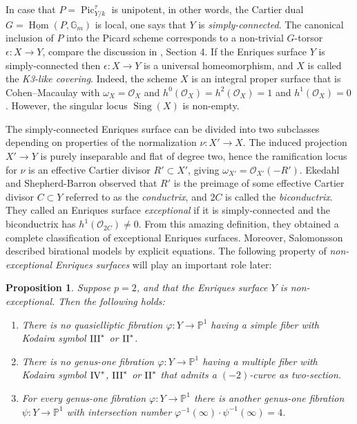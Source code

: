 \documentclass[oneside, 12pt]{amsart}
\newcommand\mylabel[1]{\label{#1}\marginpar{\vspace{-1ex}\medskip\medskip\footnotesize \tt #1}}
\renewcommand\mylabel[1]{\label{#1}}
\newtheorem{proposition}[theorem]{Proposition}
\theoremstyle{definition}
\theoremstyle{remark}
\newcommand{\PP}{\mathbb{P}}
\newcommand{\GG}{\mathbb{G}}
\newcommand{\II}{\text{\rm II}}
\newcommand{\III}{\text{\rm III}}
\newcommand{\IV}{\text{\rm IV}}
\renewcommand{\O}{\mathscr{O}}
\newcommand{\Pic}{\operatorname{Pic}}
\newcommand{\ra}{\rightarrow}
\newcommand{\Sing}{\operatorname{Sing}}
\newcommand{\uHom}{\underline{\operatorname{Hom}}}
\newcommand{\inv}{{-1}}
\begin{document}
In case that $P=\Pic^\tau_{Y/k}$ is unipotent, in other words, the Cartier dual $G=\uHom(P,\GG_m)$ is local,
one says that $Y$ is \emph{simply-connected}.
The canonical inclusion of $P$ into the Picard scheme corresponds to a non-trivial $G$-torsor $\epsilon:X\ra Y$,
compare the discussion in \cite{Schroeer 2021a}, Section 4.
If the Enriques surface $Y$ is simply-connected  then $\epsilon:X\ra Y$ is a universal homeomorphism, and  $X$ is called
the \emph{K3-like covering}. Indeed, the scheme $X$ is an integral proper surface that is Cohen--Macaulay 
with $\omega_X=\O_X$ and $h^0(\O_X)=h^2(\O_X)=1$ and $h^1(\O_X)=0$.
However, the singular locus $\Sing(X)$ is non-empty.

The simply-connected Enriques surface can be divided into two   subclasses depending on
properties of the normalization $\nu:X'\ra X$. The induced projection $X'\ra Y$ is purely inseparable and flat of degree two,
hence the ramification locus for $\nu$ is an effective Cartier divisor $R'\subset X'$, giving $\omega_{X'}=\O_{X'}(-R')$.
Ekedahl and Shepherd-Barron \cite{Ekedahl; Shepherd-Barron 2004} 
observed that $R'$ is the preimage of some effective Cartier divisor $C\subset Y$
referred to as the  \emph{conductrix}, and  $2C$ is called the \emph{biconductrix}.
They  called an Enriques surface \emph{exceptional} if it is simply-connected and 
the biconductrix has $h^1(\O_{2C})\neq 0$. From this amazing definition, they obtained a complete classification
of exceptional Enriques surfaces. Moreover, Salomonsson \cite{Salomonsson 2003} described birational models by explicit equations.
The following property of  \emph{non-exceptional Enriques surfaces} will play an important role later:

\begin{proposition}
\mylabel{properties non-exceptional}
Suppose $p=2$, and that the Enriques surface $Y$ is non-except\-ional. Then the following holds:
\begin{enumerate}
\item 
There is no quasielliptic fibration $\varphi:Y\ra\PP^1$ having a simple fiber  
with Kodaira symbol $\III^*$ or $\II^*$.
\item 
There is no genus-one fibration $\varphi:Y\ra\PP^1$ having a multiple fiber   with Kodaira symbol
$\IV^*$, $\III^*$ or $\II^*$ that admits a $(-2)$-curve   as two-section.
\item
For every genus-one fibration $\varphi:Y\ra\PP^1$ there is another genus-one fibration $\psi:Y\ra\PP^1$
with intersection number $\varphi^\inv(\infty)\cdot \psi^\inv(\infty)=4$.
\end{enumerate}
\end{proposition}
\end{document}
